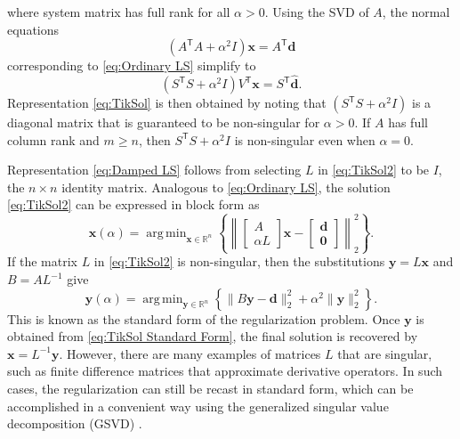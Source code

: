 \documentclass[12pt]{article}
\newcommand{\dVec}{\mathbf{d}}	%
\newcommand{\xVec}{\mathbf{x}}	%
\newcommand{\trans}[1]{{#1}^\mathsf{T}}	%
\newcommand{\regparam}{\alpha}
\DeclareMathOperator*{\argmin}{arg\,min}
\newcommand{\svd}[1]{\widehat{#1}}	%
\begin{document}
where system matrix has full rank for all $\regparam > 0$. Using the SVD of $A$, the normal equations 
\[(\trans{A}A + \regparam^2 I)\xVec = \trans{A}\dVec\]
corresponding to \eqref{eq:Ordinary LS} simplify to
\[(\trans{S}S + \regparam^2 I)\trans{V}\xVec = \trans{S}\svd{\dVec}.\]
Representation \eqref{eq:TikSol} is then obtained by noting that $(\trans{S}S + \regparam^2 I)$ is a diagonal matrix that is guaranteed to be non-singular for $\regparam > 0$. If $A$ has full column rank and $m \geq n$, then $\trans{S}S + \regparam^2 I$ is non-singular even when $\regparam = 0$. \par
Representation \eqref{eq:Damped LS} follows from selecting $L$ in \eqref{eq:TikSol2} to be $I$, the $n \times n$ identity matrix. Analogous to \eqref{eq:Ordinary LS}, the solution \eqref{eq:TikSol2} can be expressed in block form as
\begin{equation}
\xVec(\regparam) = \argmin_{\xVec \in \mathbb{R}^n} \left\{\left\| \begin{bmatrix}
A \\
\regparam L
\end{bmatrix}\xVec - \begin{bmatrix}
\dVec \\
\bm{0}
\end{bmatrix} \right\|_2^2\right\}.
\label{eq:TikSol3}
\end{equation}
If the matrix $L$ in \eqref{eq:TikSol2} is non-singular, then the substitutions $\mathbf{y} = L\xVec$ and $B = A{L}^{-1}$ give
\begin{equation}
\mathbf{y}(\regparam) = \argmin_{\mathbf{y} \in \mathbb{R}^n} \left\{\|B\mathbf{y} - \dVec\|_2^2 + \regparam^2\|\mathbf{y}\|_2^2\right\}.
\label{eq:TikSol Standard Form}
\end{equation}
This is known as the standard form of the regularization problem. Once $\mathbf{y}$ is obtained from \eqref{eq:TikSol Standard Form}, the final solution is recovered by $\xVec = L^{-1}\mathbf{y}$.  However, there are many examples of matrices $L$ that are singular, such as finite difference matrices that approximate derivative operators. In such cases, the regularization can still be recast in standard form, which can be accomplished in a convenient way using the generalized singular value decomposition (GSVD) \cite{HansenGSVD,Hansen:98}.
\end{document}
